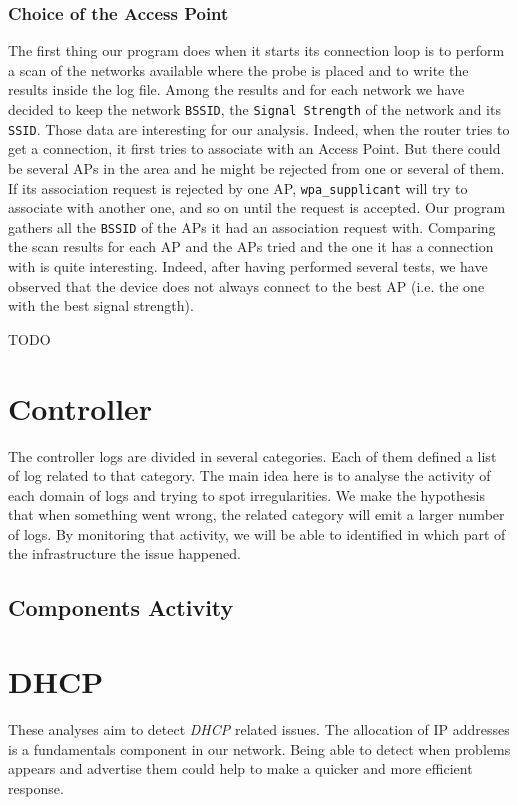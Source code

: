 \subsubsection*{Choice of the Access Point}
The first thing our program does when it starts its connection loop is to perform a scan of the networks available where the probe is placed and to write the results inside the log file. Among the results and for each network we have decided to keep the network \texttt{BSSID}, the \texttt{Signal Strength} of the network and its \texttt{SSID}. Those data are interesting for our analysis. Indeed, when the router tries to get a connection, it first tries to associate with an Access Point. But there could be several APs in the area and he might be rejected from one or several of them. If its association request is rejected by one AP, \texttt{wpa\_supplicant} will try to associate with another one, and so on until the request is accepted. Our program gathers all the \texttt{BSSID} of the APs it had an association request with. 
Comparing the scan results for each AP and the APs tried and the one it has a connection with is quite interesting. Indeed, after having performed several tests, we have observed that the device does not always connect to the best AP (i.e. the one with the best signal strength).

TODO

\section{Controller}
The controller logs are divided in several categories. Each of them defined a list of log related to that category. The main idea here is to analyse the activity of each domain of logs and trying to spot irregularities. We make the hypothesis that when something went wrong, the related category will emit a larger number of logs. By monitoring that activity, we will be able to identified in which part of the infrastructure the issue happened.

\subsection{Components Activity}


\section{DHCP}
These analyses aim to detect \emph{DHCP} related issues. The allocation  of IP addresses is a fundamentals component in our network. Being able to detect when problems appears and advertise them could help to make a quicker and more efficient response.

